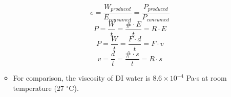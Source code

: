 \begin{itemize}
\begin{itemize}
\[e = \frac{W_{produced}}{E_{consumed}} = \frac{P_{produced}}{P_{consumed}}\]
\begin{equation}
P = \frac{W}{t} = \frac{\# \cdot E}{t} = R \cdot E
\end{equation} 
\begin{equation}
P = \frac{W}{t} = \frac{F \cdot d}{t} = F \cdot v
\end{equation} 
\begin{equation}
v = \frac{d}{t} = \frac{\# \cdot s}{t} = R \cdot s
\end{equation} 
\item For comparison, the viscosity of DI water is $8.6 \times 10^{-4}$ Pa$\cdot$s at room temperature (27 $^{\circ}$C).
\end{itemize}
\end{itemize}